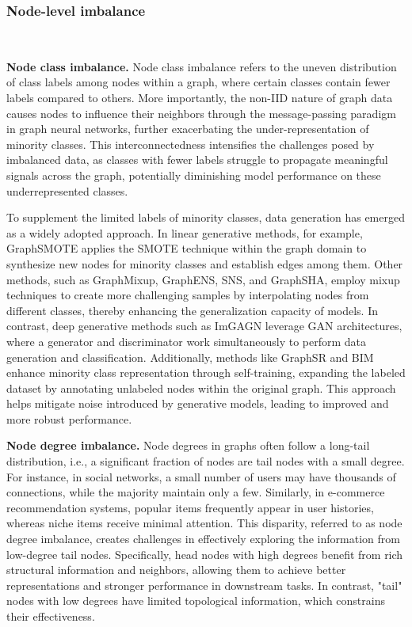 \subsubsection{Node-level imbalance}\ 

\textbf{Node class imbalance.} Node class imbalance refers to the uneven distribution of class labels among nodes within a graph, where certain classes contain fewer labels compared to others. More importantly, the non-IID nature of graph data causes nodes to influence their neighbors through the message-passing paradigm in graph neural networks, further exacerbating the under-representation of minority classes. This interconnectedness intensifies the challenges posed by imbalanced data, as classes with fewer labels struggle to propagate meaningful signals across the graph, potentially diminishing model performance on these underrepresented classes.

To supplement the limited labels of minority classes, data generation has emerged as a widely adopted approach. In linear generative methods, for example, GraphSMOTE applies the SMOTE technique within the graph domain to synthesize new nodes for minority classes and establish edges among them. Other methods, such as GraphMixup, GraphENS, SNS, and GraphSHA, employ mixup techniques to create more challenging samples by interpolating nodes from different classes, thereby enhancing the generalization capacity of models. In contrast, deep generative methods such as ImGAGN leverage GAN architectures, where a generator and discriminator work simultaneously to perform data generation and classification. Additionally, methods like GraphSR and BIM enhance minority class representation through self-training, expanding the labeled dataset by annotating unlabeled nodes within the original graph. This approach helps mitigate noise introduced by generative models, leading to improved and more robust performance.

\textbf{Node degree imbalance.}
Node degrees in graphs often follow a long-tail distribution, i.e., a significant fraction of nodes are tail nodes with
a small degree. For instance, in social networks, a small number of users may have thousands of connections, while the majority maintain only a few. Similarly, in e-commerce recommendation systems, popular items frequently appear in user histories, whereas niche items receive minimal attention. This disparity, referred to as node degree imbalance, creates challenges in effectively exploring the information from low-degree tail nodes. Specifically, head nodes with high degrees benefit from rich structural information and neighbors, allowing them to achieve better representations and stronger performance in downstream tasks. In contrast, "tail" nodes with low degrees have limited topological information, which constrains their effectiveness.

